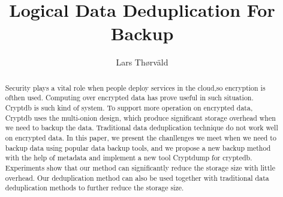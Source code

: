 \documentclass[sigconf]{acmart}
\begin{document}
\title{Logical Data Deduplication For Backup}


\author{Lars Th{\o}rv{\"a}ld}




\begin{abstract}

Security plays a vital role when people deploy services in the cloud,so encryption is ofthen used. Computing over encrypted data has prove useful in such situation. Cryptdb\citep{popa2011cryptdb} is such kind of system. To support more operation on encrypted data, Cryptdb uses the multi-onion design, which produce significant storage overhead when we need to backup the data. Traditional data deduplication technique do not work well on encrypted data. In this paper, we present the chanllenges we meet when we need to backup data using popular data backup tools, and we propose a new backup method with the help of metadata and implement a new tool Cryptdump for cryptedb. Experiments show that our method can  significantly reduce the storage size with little overhead. Our deduplication method can also be used together with traditional data deduplication methods to further reduce the storage size.


\end{abstract}



\maketitle












 
\end{document}
